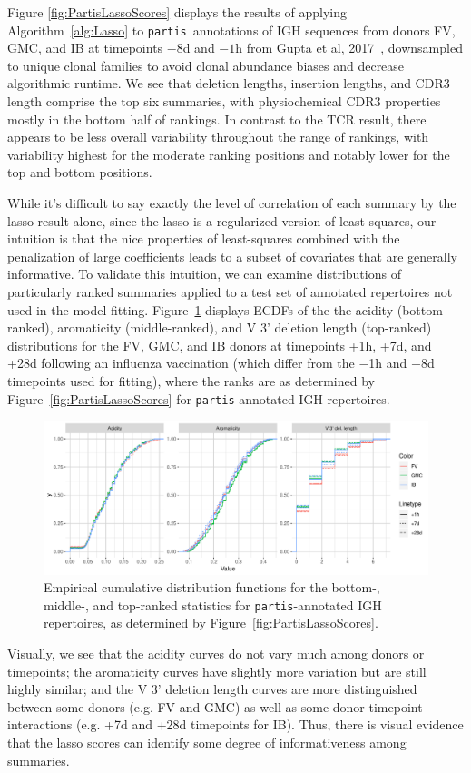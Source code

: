 \documentclass{article}
\newcommand{\partis}{\texttt{partis}}
\begin{document}
Figure \ref{fig:PartisLassoScores} displays the results of applying Algorithm~\ref{alg:Lasso} to \partis\ annotations of IGH sequences from donors FV, GMC, and IB at timepoints $-8$d and $-1$h from Gupta et al, 2017~\cite{Gupta2017-ve}, downsampled to unique clonal families to avoid clonal abundance biases and decrease algorithmic runtime.
We see that deletion lengths, insertion lengths, and CDR3 length comprise the top six summaries, with physiochemical CDR3 properties mostly in the bottom half of rankings.
In contrast to the TCR result, there appears to be less overall variability throughout the range of rankings, with variability highest for the moderate ranking positions and notably lower for the top and bottom positions.

While it's difficult to say exactly the level of correlation of each summary by the lasso result alone, since the lasso is a regularized version of least-squares, our intuition is that the nice properties of least-squares combined with the penalization of large coefficients leads to a subset of covariates that are generally informative.
To validate this intuition, we can examine distributions of particularly ranked summaries applied to a test set of annotated repertoires not used in the model fitting.
Figure~\ref{fig:LassoValidation} displays ECDFs of the the acidity (bottom-ranked), aromaticity (middle-ranked), and V 3' deletion length (top-ranked) distributions for the FV, GMC, and IB donors at timepoints +1h, +7d, and +28d following an influenza vaccination (which differ from the $-$1h and $-$8d timepoints used for fitting), where the ranks are as determined by Figure~\ref{fig:PartisLassoScores} for \partis-annotated IGH repertoires.
\begin{figure}
	\includegraphics[width=\linewidth]{Figures/Lasso/validation_ecdfs.pdf}
	\caption{Empirical cumulative distribution functions for the bottom-, middle-, and top-ranked statistics for \partis-annotated IGH repertoires, as determined by Figure~\ref{fig:PartisLassoScores}.}
	\label{fig:LassoValidation}
\end{figure}
Visually, we see that the acidity curves do not vary much among donors or timepoints; the aromaticity curves have slightly more variation but are still highly similar; and the V 3' deletion length curves are more distinguished between some donors (e.g. FV and GMC) as well as some donor-timepoint interactions (e.g. +7d and +28d timepoints for IB).
Thus, there is visual evidence that the lasso scores can identify some degree of informativeness among summaries.
\end{document}

